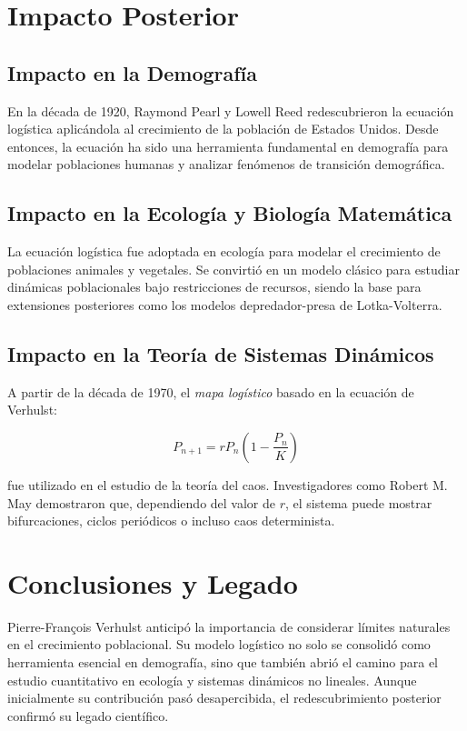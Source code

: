 \documentclass[12pt]{article}
\begin{document}
\section{Impacto Posterior}

\subsection{Impacto en la Demografía}

En la década de 1920, Raymond Pearl y Lowell Reed redescubrieron la ecuación logística aplicándola al crecimiento de la población de Estados Unidos. Desde entonces, la ecuación ha sido una herramienta fundamental en demografía para modelar poblaciones humanas y analizar fenómenos de transición demográfica.

\subsection{Impacto en la Ecología y Biología Matemática}

La ecuación logística fue adoptada en ecología para modelar el crecimiento de poblaciones animales y vegetales. Se convirtió en un modelo clásico para estudiar dinámicas poblacionales bajo restricciones de recursos, siendo la base para extensiones posteriores como los modelos depredador-presa de Lotka-Volterra.

\subsection{Impacto en la Teoría de Sistemas Dinámicos}

A partir de la década de 1970, el \textit{mapa logístico} basado en la ecuación de Verhulst:

\begin{equation}
P_{n+1} = r P_n \left(1 - \frac{P_n}{K}\right)
\end{equation}

fue utilizado en el estudio de la teoría del caos. Investigadores como Robert M. May demostraron que, dependiendo del valor de \( r \), el sistema puede mostrar bifurcaciones, ciclos periódicos o incluso caos determinista.

\section{Conclusiones y Legado}

Pierre-François Verhulst anticipó la importancia de considerar límites naturales en el crecimiento poblacional. Su modelo logístico no solo se consolidó como herramienta esencial en demografía, sino que también abrió el camino para el estudio cuantitativo en ecología y sistemas dinámicos no lineales. Aunque inicialmente su contribución pasó desapercibida, el redescubrimiento posterior confirmó su legado científico.
\end{document}
